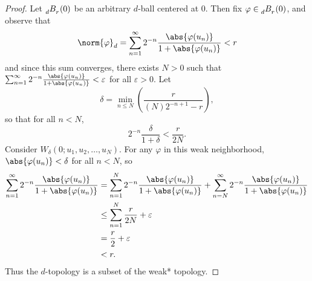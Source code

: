 \documentclass[12pt,letterpaper]{article}
\renewcommand{\phi}{\varphi}
\renewcommand{\epsilon}{\varepsilon}
\begin{document}
\begin{enumerate}
\begin{proof}
Let $\dball$ be an arbitrary $d$-ball centered at 0. Then fix $\phi\in \dball$, and observe that
$$\norm{\phi}_d=\sum_{n=1}^\infty 2^{-n}\frac{\abs{\phi(u_n)}}{1+\abs{\phi(u_n)}}<r$$
and since this sum converges, there exists $N>0$ such that $\sum_{n=1}^\infty 2^{-n}\frac{\abs{\phi(u_n)}}{1+\abs{\phi(u_n)}}<\epsilon$ for all $\epsilon>0$. Let 
$$\delta=\min_{n\leq N}\left(\frac{r}{(N)2^{-n+1}-r}\right),$$
so that for all $n<N$, 
$$2^{-n}\frac{\delta}{1+\delta}<\frac{r}{2N}.$$
Consider $W_\delta(0;u_1, u_2, \dots, u_N).$ For any $\phi$ in this weak neighborhood, $\abs{\phi(u_n)}<\delta$ for all $n<N$, so 
\begin{align*}
\sum_{n=1}^\infty 2^{-n}\frac{\abs{\phi(u_n)}}{1+\abs{\phi(u_n)}}
&=\sum_{n=1}^N 2^{-n}\frac{\abs{\phi(u_n)}}{1+\abs{\phi(u_n)}}
  + \sum_{n=N}^\infty 2^{-n}\frac{\abs{\phi(u_n)}}{1+\abs{\phi(u_n)}}\\
&\leq \sum_{n=1}^N \frac{r}{2N}
  + \epsilon\\
&=\frac{r}{2}+\epsilon\\
&<r.
\end{align*}
Thus the $d$-topology is a subset of the weak* topology.
\end{proof}










\end{enumerate}
\end{document}

